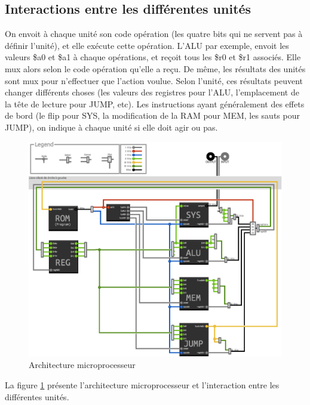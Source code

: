 \documentclass{article}
\begin{document}
\subsection{Interactions entre les différentes unités}

On envoit à chaque unité son code opération (les quatre bits qui ne servent pas
à définir l'unité), et elle exécute cette opération. L'ALU par exemple, envoit
les valeurs \$a0 et \$a1 à chaque opérations, et reçoit tous les \$r0 et \$r1
associés. Elle mux alors selon le code opération qu'elle a reçu. De même, les
résultats des unités sont mux pour n'effectuer que l'action voulue. Selon
l'unité, ces résultats peuvent changer différents choses (les valeurs des
registres pour l'ALU, l'emplacement de la tête de lecture pour JUMP, etc).
Les instructions ayant généralement des effets de bord (le flip pour SYS,
la modification de la RAM pour MEM, les sauts pour JUMP), on indique à chaque
unité si elle doit agir ou pas.\\

\begin{figure}[h]
\centering
\includegraphics{archi.eps}
\caption{\label{archi} Architecture microprocesseur}
\end{figure}
La figure \ref{archi} présente l'architecture microprocesseur et l'interaction
entre les différentes unités.
\end{document}

